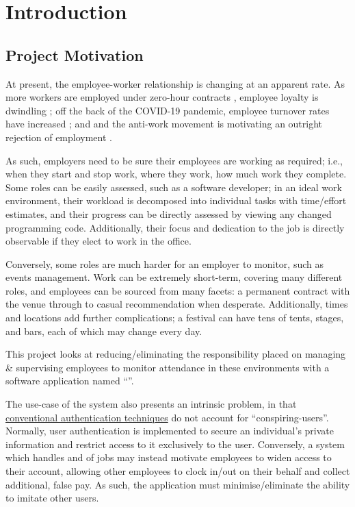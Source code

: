 \chapter{Introduction}

\section{Project Motivation} \label{s:motivation}

At present, the employee-worker relationship is changing at
an apparent rate.
As more workers are employed under zero-hour contracts
\parencite{zeroHourContractsStats}, employee loyalty is
dwindling \parencite{zeroHourContractsLoyalty}; off the
back of the COVID-19 pandemic, employee turnover rates have
increased \parencite{employeeTurnover}; and and the
anti-work movement is motivating an outright rejection of
employment \parencite{antiWorkMovement}.

As such, employers need to be sure their employees are
working as required; i.e., when they start and stop work,
where they work, how much work they complete.
Some roles can be easily assessed, such as a software
developer; in an ideal work environment, their workload is
decomposed into individual tasks with time/effort
estimates, and their progress can be directly assessed by
viewing any changed programming code.
Additionally, their focus and dedication to the job is
directly observable if they elect to work in the office.

Conversely, some roles are much harder for an employer to
monitor, such as events management.
Work can be extremely short-term, covering many different
roles, and employees can be sourced from many facets: a
permanent contract with the venue through to casual
recommendation when desperate.
Additionally, times and locations add further
complications; a festival can have tens of tents, stages,
and bars, each of which may change every day.

This project looks at reducing/eliminating the
responsibility placed on managing \& supervising employees
to monitor attendance in these environments with a software
application named \enquote{\projectname}.

The use-case of the system also presents an intrinsic
problem, in that \hyperref[s:userAuth]{conventional
  authentication techniques} do not account for
\enquote{\gls{conspiring-users}}.
Normally, user authentication is implemented to secure an
individual's private information and restrict access to it
exclusively to the user.
Conversely, a system which handles
 and
 of jobs may instead
motivate employees to widen access to their account,
allowing other employees to clock in/out on their behalf
and collect additional, false pay.
As such, the application must minimise/eliminate the
ability to imitate other users.

